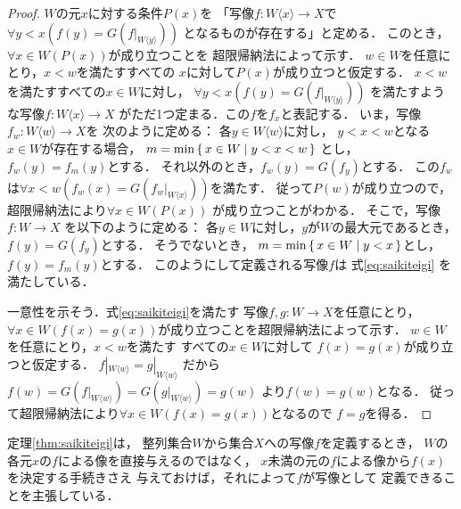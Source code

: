    \begin{proof}
     $W$の元$x$に対する条件$P(x)$を
     「写像$f : W \langle x \rangle \longrightarrow X$で
     $\forall y < x \left(f(y) = G \left( f | _
       {W \langle y \rangle}   \right) \right)$
     となるものが存在する」と定める．
     このとき，$\forall x \in W ( P(x) )$が成り立つことを
     超限帰納法によって示す．
     $w \in W$を任意にとり，$x < w$を満たすすべての
     $x$に対して$P(x)$が成り立つと仮定する．
     $x < w$を満たすすべての$x \in W$に対し，
     $\forall y < x \left( f(y) = 
       G \left( f|_{W \langle y \rangle } \right) \right)$
     を満たすような写像$f: W \langle x \rangle \longrightarrow X$
     がただ1つ定まる．この$f$を$f_x$と表記する．
     いま，写像$f_w : W \langle w \rangle \longrightarrow X$を
     次のように定める：
     各$y \in W \langle w \rangle$に対し，
     $y < x < w$となる$x \in W$が存在する場合，
     $m = \min \set{ x \in W \mid y < x < w }$
     とし，$f_w(y) = f_m(y)$とする．
     それ以外のとき，$f_w(y) = G( f_y )$とする．
     この$f_w$は$\forall x < w \left(f_w(x) 
       = G \left( f_w |_
     {W \langle x \rangle} \right) \right)$を満たす．
     従って$P(w)$が成り立つので，
     超限帰納法により$\forall x \in W ( P(x))$
     が成り立つことがわかる．
     そこで，写像$f: W \longrightarrow X$
     を以下のように定める：
     各$y \in W$に対し，$y$が$W$の最大元であるとき，
     $f(y) = G(f_y)$とする．
     そうでないとき，
     $m = \min \set{ x \in W \mid y<x}$とし，
     $f(y) = f_m(y)$とする．
     このようにして定義される写像$f$は
     式\eqref{eq:saikiteigi}
     を満たしている．

     一意性を示そう．式\eqref{eq:saikiteigi}を満たす
     写像$f,g : W \longrightarrow X$を任意にとり，
     $\forall x \in W (f(x)=g(x))$が成り立つことを超限帰納法によって示す．
     $w \in W$を任意にとり，$x < w$を満たす
     すべての$x \in W$に対して
     $f(x) = g(x)$が成り立つと仮定する．
     $f|_{W \langle w \rangle} = g|_{W \langle w \rangle}$
     だから$f(w) = G \left( f|_{W \langle w \rangle} \right) 
     = G \left(g|_{W \langle w \rangle } \right) = g(w)$
     より$f(w)=g(w)$となる．
     従って超限帰納法により$\forall x \in W (f(x) = g(x))$となるので
     $f=g$を得る．
    \end{proof}

    定理\ref{thm:saikiteigi}は，
    整列集合$W$から集合$X$への写像$f$を定義するとき，
    $W$の各元$x$の$f$による像を直接与えるのではなく，
    $x$未満の元の$f$による像から$f(x)$を決定する手続きさえ
    与えておけば，それによって$f$が写像として
    定義できることを主張している．


